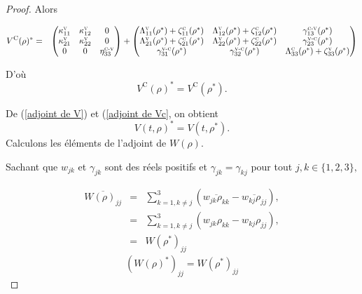 \documentclass[12pt,a4paper,openany,oneside]{book}
\begin{document}
{{{{{{\begin{proof}
Alors 
\begin{small}
  \begin{eqnarray*}
  V^{\textrm{C}}(\rho)^{*}  
 & = &  \begin{pmatrix}
                            \kappa^{\textsc{v}}_{11} & \kappa^{\textsc{v}}_{12}   &          0 \\
                            \kappa^{\textsc{v}}_{21} & \kappa^{\textsc{v}}_{22}   &          0 \\
                                     0          &        0              &   \eta^{\textsc{c-v}}_{33}
         \end{pmatrix}  +  \begin{pmatrix}
\Lambda^{\textsc{v}}_{11}(\rho^{*})+\zeta^{\textsc{c}}_{11}(\rho^{*}) & \Lambda^{\textsc{v}}_{12}(\rho^{*})+\zeta^{\textsc{c}}_{12}(\rho^{*})   & \gamma^{\textsc{c-v}}_{13}(\rho^{*})\\
\Lambda^{\textsc{v}}_{21}(\rho^{*})+ \zeta^{\textsc{c}}_{21}(\rho^{*}) & \Lambda^{\textsc{v}}_{22}(\rho^{*})+ \zeta^{\textsc{c}}_{22}(\rho^{*})   & \gamma^{\textsc{v-c}}_{23}(\rho^{*})\\
\gamma^{\textsc{v-c}}_{31}(\rho^{*})& \gamma^{\textsc{v-c}}_{32}(\rho^{*}) & \Lambda^{\textsc{c}}_{33}(\rho^{*})+ \zeta^{\textsc{v}}_{33}(\rho^{*})
         \end{pmatrix}      
  \end{eqnarray*} 
\end{small} 

D'où
 \begin{equation}\label{adjoint de Vc}
 V^{\textrm{C}}(\rho)^{*} = V^{\textrm{C}}(\rho^{*}).
\end{equation}

De (\ref{adjoint de V}) et (\ref{adjoint de Vc}, on obtient 
$$ V(t,\rho)^{*} = V(t,\rho^{*}) . $$ 
Calculons les éléments de l'adjoint de $ W(\rho) $.

Sachant que $w_{jk}$ et $\gamma_{jk}$ sont des réels positifs et $ \gamma_{jk} = \gamma_{kj}$ pour tout    $ j,k \in \{1,2,3\},$

\begin{eqnarray*}
\overline{W(\rho)_{jj}} & = & \displaystyle\sum_{k=1,k\neq j}^{3} \left(\overline{w_{jk}\rho_{kk}}- \overline{w_{kj}\rho_{jj}}\right), \\
 & = & \displaystyle\sum_{k=1,k\neq j}^{3} (w_{jk}\rho_{kk}- w_{kj}\rho_{jj}), \\
 & = & W(\rho^{*})_{jj}
\end{eqnarray*}
 $$ (W(\rho)^{*})_{jj}= W(\rho^{*})_{jj} $$


\end{proof}}}}}}}
\end{document}
